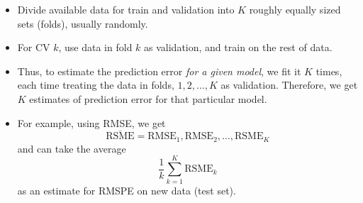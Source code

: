\begin{itemize}
\begin{figure}[!ht]
          \end{figure}
          \begin{itemize}
              \item Divide available data for train and validation
                    into $ K $ roughly equally sized sets (folds),
                    usually randomly.
              \item For CV $ k $, use data in fold $ k $
                    as validation, and train on
                    the rest of data.
              \item Thus, to estimate the prediction error
                    \emph{for a given model}, we fit it $ K $ times, each
                    time treating the data in folds, $ 1,2,\ldots,K $
                    as validation.
                    Therefore, we get $ K $ estimates of prediction error
                    for that particular model.
              \item For example, using RMSE, we get
                    \[ \overline{\text{RSME}}
                        =\text{RMSE}_1,\text{RMSE}_2,\ldots,\text{RSME}_K \]
                    and can take the average
                    \[ \frac{1}{k} \sum_{k=1}^{K}\text{RSME}_k \]
                    as an estimate for RMSPE on new data (test set).
          \end{itemize}
\end{itemize}
